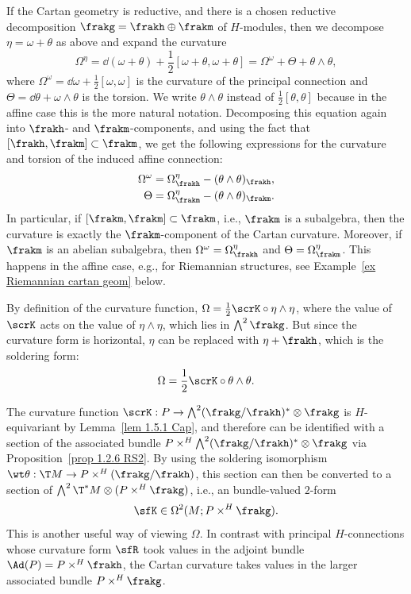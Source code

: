 \begin{rem}\label{rem torsion in reductive geom}
    If the Cartan geometry is reductive, and there is a chosen reductive decomposition $\frakg=\frakh\oplus\frakm$ of $H$-modules, then we decompose $\eta=\omega+\theta$ as above and expand the curvature 
    \[
        \Omega^\eta=\dd (\omega+\theta)+\frac12[\omega+\theta,\omega+\theta]=\Omega^\omega+\Theta+\theta\wedge\theta,\label{eq curvature of reductive}
    \]
    where $\Omega^\omega=\dd\omega+\frac12[\omega,\omega]$ is the curvature of the principal connection and $\Theta=\dd\theta+\omega\wedge\theta$ is the torsion. We write $\theta\wedge\theta$ instead of $\frac12[\theta,\theta]$ because in the affine case this is the more natural notation. Decomposing this equation again into $\frakh$- and $\frakm$-components, and using the fact that $[\frakh,\frakm]\subset \frakm$, we get the following expressions for the curvature and torsion of the induced affine connection:
    \begin{align}
        \Omega^\omega&=\Omega^\eta_\frakh-(\theta\wedge\theta)_{\frakh},\\
        \Theta&=\Omega^\eta_\frakm-(\theta\wedge\theta)_\frakm.
    \end{align}
    In particular, if $[\frakm,\frakm]\subset\frakm$, i.e., $\frakm$ is a subalgebra, then the curvature is exactly the $\frakm$-component of the Cartan curvature. Moreover, if $\frakm$ is an abelian subalgebra, then $\Omega^\omega=\Omega^\eta_\frakh$ and $\Theta=\Omega^\eta_\frakm$. This happens in the affine case, e.g., for Riemannian structures, see Example~\ref{ex Riemannian cartan geom} below.
\end{rem}

\begin{rem}
    By definition of the curvature function, $\Omega=\frac12\scrK\circ \eta\wedge\eta$, where the value of $\scrK$ acts on the value of $\eta\wedge\eta$, which lies in $\bigwedge\nolimits^2\frakg$. But since the curvature form is horizontal, $\eta$ can be replaced with $\eta+\frakh$, which is the soldering form:
    \[\Omega=\frac12\scrK \circ \theta\wedge\theta.\]

    The curvature function $\scrK:P\to \bigwedge\nolimits^2(\frakg\slash\frakh)^\ast\otimes\frakg$ is $H$-equivariant by Lemma~\ref{lem 1.5.1 Cap}, and therefore can be identified with a section of the associated bundle $P\times^H \bigwedge\nolimits^2(\frakg\slash\frakh)^\ast\otimes\frakg$ via Proposition~\ref{prop 1.2.6 RS2}. By using the soldering isomorphism $\wt\theta:\T M\to P\times^H(\frakg\slash\frakh)$, this section can then be converted to a section of $\bigwedge\nolimits^2\T^\ast M\otimes (P\times^H\frakg)$, i.e., an bundle-valued $2$-form 
    \[\sfK\in \Omega^2(M;P\times^H\frakg).\] 
    This is another useful way of viewing $\Omega$. In contrast with principal $H$-connections whose curvature form $\sfR$ took values in the adjoint bundle $\Ad(P)=P\times^H \frakh$, the Cartan curvature takes values in the larger associated bundle $P\times^H \frakg$.
\end{rem}




